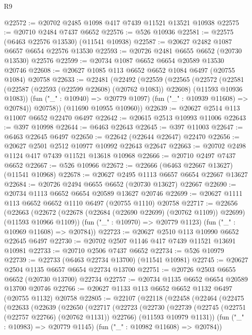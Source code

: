 \begin{lexlean}{R9}
\begin{coremodule}
@22572 := @20702 @2485 @1098 @417 @7439 @11521 @13521 @10938
@22575 := @20710 @2484 @7437 @6652
@22576 := @526 @10936
@22581 := @22575 (@6463 @22576 @13530) (@11541 @10938)
@22587 := @20627 @2482 @1087 @6657 @6654 @22576 @13530
@22593 := @20726 @2481 @6655 @6652 (@20730 @13530) @22576
@22599 := @20734 @1087 @6652 @6654 @20589 @13530 @20746
@22608 := @20627 @1085 @113 @6652 @6652 @1084 @6497 (@20755 @1084) @20758
@22633 := @22481
    (@22492
      (@22559
        (@22565
          (@22572
            (@22581 (@22587 (@22593 (@22599 @22608) (@20762 @1083)) @22608) (@11593 @10936 @1083))
            (fun ("_" : @10940) => @20779 @1097)
            (fun ("_" : @10939 @11608) => @20784))
          @20758))
      (@11690 @10955 @10960))
@22639 := @20627 @2514 @113 @11007 @6652 @22470 @6497
@22642 := @20615 @2513 @10993 @11006
@22643 := @397 @10998
@22644 := @6463 @22643
@22645 := @397 @11003
@22647 := @6463 @22645 @6497
@22650 := @22642 (@22644 @22647) @22470
@22656 := @20627 @2501 @2512 @10977 @10992 @22643 @22647
@22663 := @20702 @2498 @1124 @417 @7439 @11521 @13618 @10968
@22666 := @20710 @2497 @7437 @6652
@22667 := @526 @10966
@22672 := @22666 (@6463 @22667 @13627) (@11541 @10968)
@22678 := @20627 @2495 @1113 @6657 @6654 @22667 @13627
@22684 := @20726 @2494 @6655 @6652 (@20730 @13627) @22667
@22690 := @20734 @1113 @6652 @6654 @20589 @13627 @20746
@22699 := @20627 @1111 @113 @6652 @6652 @1110 @6497 (@20755 @1110) @20758
@22717 := @22656
    (@22663
      (@22672 (@22678 (@22684 (@22690 @22699) (@20762 @1109)) @22699) (@11593 @10966 @1109))
      (fun ("_" : @10970) => @20779 @1123)
      (fun ("_" : @10969 @11608) => @20784))
@22723 := @20627 @2510 @113 @10990 @6652 @22645 @6497
@22730 := @20702 @2507 @1146 @417 @7439 @11521 @13691 @10981
@22733 := @20710 @2506 @7437 @6652
@22734 := @526 @10979
@22739 := @22733 (@6463 @22734 @13700) (@11541 @10981)
@22745 := @20627 @2504 @1135 @6657 @6654 @22734 @13700
@22751 := @20726 @2503 @6655 @6652 (@20730 @13700) @22734
@22757 := @20734 @1135 @6652 @6654 @20589 @13700 @20746
@22766 := @20627 @1133 @113 @6652 @6652 @1132 @6497 (@20755 @1132) @20758
@22805 := @22107
    (@22118
      (@22458
        (@22464
          (@22475
            (@22633
              (@22639
                (@22650
                  (@22717
                    (@22723
                      (@22730
                        (@22739
                          (@22745 (@22751 (@22757 @22766) (@20762 @1131)) @22766)
                          (@11593 @10979 @1131))
                        (fun ("_" : @10983) => @20779 @1145)
                        (fun ("_" : @10982 @11608) => @20784))

\end{coremodule}
\end{lexlean}
